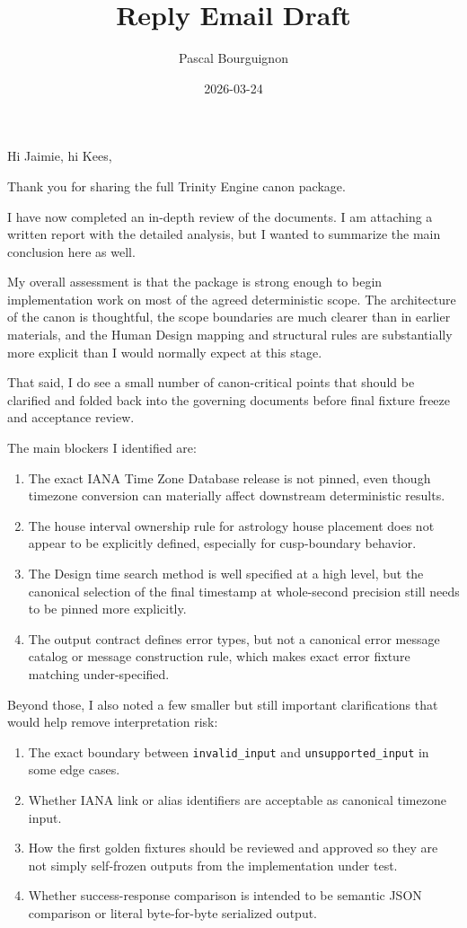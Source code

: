 \documentclass[11pt]{article}
\author{Pascal Bourguignon}
\date{2026-03-24}
\title{Reply Email Draft}
\begin{document}
\maketitle
Hi Jaimie, hi Kees,

Thank you for sharing the full Trinity Engine canon package.

I have now completed an in-depth review of the documents. I am attaching a written report with the detailed analysis, but I wanted to summarize the main conclusion here as well.

My overall assessment is that the package is strong enough to begin implementation work on most of the agreed deterministic scope. The architecture of the canon is thoughtful, the scope boundaries are much clearer than in earlier materials, and the Human Design mapping and structural rules are substantially more explicit than I would normally expect at this stage.

That said, I do see a small number of canon-critical points that should be clarified and folded back into the governing documents before final fixture freeze and acceptance review.

The main blockers I identified are:

\begin{enumerate}
\item The exact IANA Time Zone Database release is not pinned, even though timezone conversion can materially affect downstream deterministic results.
\item The house interval ownership rule for astrology house placement does not appear to be explicitly defined, especially for cusp-boundary behavior.
\item The Design time search method is well specified at a high level, but the canonical selection of the final timestamp at whole-second precision still needs to be pinned more explicitly.
\item The output contract defines error types, but not a canonical error message catalog or message construction rule, which makes exact error fixture matching under-specified.
\end{enumerate}

Beyond those, I also noted a few smaller but still important clarifications that would help remove interpretation risk:

\begin{enumerate}
\item The exact boundary between \texttt{invalid\_input} and \texttt{unsupported\_input} in some edge cases.
\item Whether IANA link or alias identifiers are acceptable as canonical timezone input.
\item How the first golden fixtures should be reviewed and approved so they are not simply self-frozen outputs from the implementation under test.
\item Whether success-response comparison is intended to be semantic JSON comparison or literal byte-for-byte serialized output.
\end{enumerate}
\end{document}
